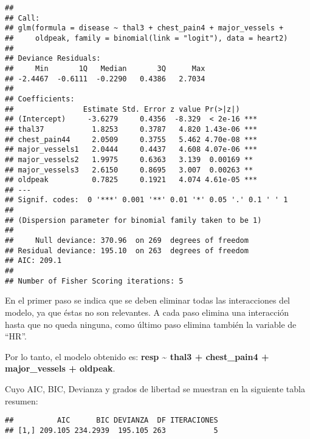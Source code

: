 \documentclass[]{article}
\newenvironment{Shaded}{\begin{snugshade}}{\end{snugshade}}
\newcommand{\KeywordTok}[1]{\textcolor[rgb]{0.13,0.29,0.53}{\textbf{#1}}}
\newcommand{\DataTypeTok}[1]{\textcolor[rgb]{0.13,0.29,0.53}{#1}}
\newcommand{\OperatorTok}[1]{\textcolor[rgb]{0.81,0.36,0.00}{\textbf{#1}}}
\newcommand{\NormalTok}[1]{#1}
\begin{document}
\begin{verbatim}
## 
## Call:
## glm(formula = disease ~ thal3 + chest_pain4 + major_vessels + 
##     oldpeak, family = binomial(link = "logit"), data = heart2)
## 
## Deviance Residuals: 
##     Min       1Q   Median       3Q      Max  
## -2.4467  -0.6111  -0.2290   0.4386   2.7034  
## 
## Coefficients:
##                Estimate Std. Error z value Pr(>|z|)    
## (Intercept)     -3.6279     0.4356  -8.329  < 2e-16 ***
## thal37           1.8253     0.3787   4.820 1.43e-06 ***
## chest_pain44     2.0509     0.3755   5.462 4.70e-08 ***
## major_vessels1   2.0444     0.4437   4.608 4.07e-06 ***
## major_vessels2   1.9975     0.6363   3.139  0.00169 ** 
## major_vessels3   2.6150     0.8695   3.007  0.00263 ** 
## oldpeak          0.7825     0.1921   4.074 4.61e-05 ***
## ---
## Signif. codes:  0 '***' 0.001 '**' 0.01 '*' 0.05 '.' 0.1 ' ' 1
## 
## (Dispersion parameter for binomial family taken to be 1)
## 
##     Null deviance: 370.96  on 269  degrees of freedom
## Residual deviance: 195.10  on 263  degrees of freedom
## AIC: 209.1
## 
## Number of Fisher Scoring iterations: 5
\end{verbatim}

En el primer paso se indica que se deben eliminar todas las
interacciones del modelo, ya que éstas no son relevantes. A cada paso
elimina una interacción hasta que no queda ninguna, como último paso
elimina también la variable de ``HR''.

Por lo tanto, el modelo obtenido es: \textbf{resp \textasciitilde{}
thal3 + chest\_pain4 + major\_vessels + oldpeak}.

Cuyo AIC, BIC, Devianza y grados de libertad se muestran en la siguiente
tabla resumen:

\begin{Shaded}
\end{Shaded}

\begin{verbatim}
##          AIC      BIC DEVIANZA  DF ITERACIONES
## [1,] 209.105 234.2939  195.105 263           5
\end{verbatim}
\end{document}
